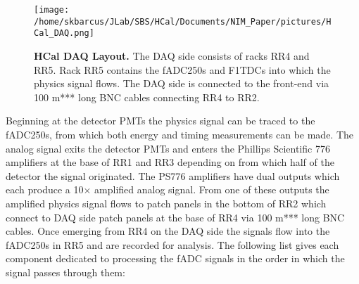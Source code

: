 \documentclass[oneside]{book}   %
\begin{document}
	\begin{figure}[!ht]
	\begin{center}
	\texttt{[image: /home/skbarcus/JLab/SBS/HCal/Documents/NIM\_Paper/pictures/HCal\_DAQ.png]}
	\end{center}
	\caption{
	{\bf{HCal DAQ Layout.}} The DAQ side consists of racks RR4 and RR5. Rack RR5 contains the fADC250s and F1TDCs into which the physics signal flows. The DAQ side is connected to the front-end via 100 m*** long BNC cables connecting RR4 to RR2.}
	\label{fig:daq}
	\end{figure}	

Beginning at the detector PMTs the physics signal can be traced to the fADC250s, from which both energy and timing measurements can be made. The analog signal exits the detector PMTs and enters the Phillips Scientific 776 amplifiers at the base of RR1 and RR3 depending on from which half of the detector the signal originated. The PS776 amplifiers have dual outputs which each produce a 10$\times$ amplified analog signal. From one of these outputs the amplified physics signal flows to patch panels in the bottom of RR2 which connect to DAQ side patch panels at the base of RR4 via 100 m*** long BNC cables. Once emerging from RR4 on the DAQ side the signals flow into the fADC250s in RR5 and are recorded for analysis. The following list gives each component dedicated to processing the fADC signals in the order in which the signal passes through them:\\
\end{document}
